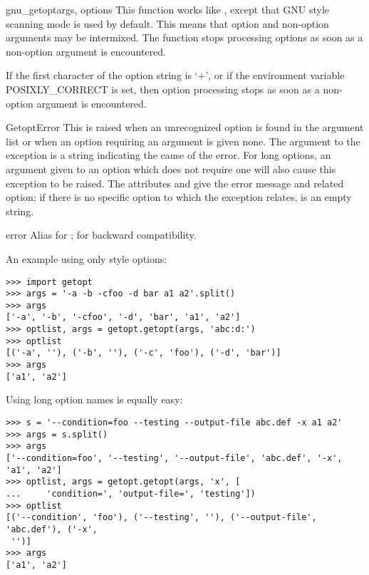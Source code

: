 \begin{funcdesc}{gnu_getopt}{args, options}
This function works like , except that GNU style
scanning mode is used by default. This means that option and
non-option arguments may be intermixed. The 
function stops processing options as soon as a non-option argument is
encountered.

If the first character of the option string is `+', or if the
environment variable POSIXLY_CORRECT is set, then option processing
stops as soon as a non-option argument is encountered.

\end{funcdesc}

\begin{excdesc}{GetoptError}
This is raised when an unrecognized option is found in the argument
list or when an option requiring an argument is given none.
The argument to the exception is a string indicating the cause of the
error.  For long options, an argument given to an option which does
not require one will also cause this exception to be raised.  The
attributes  and  give the error message and
related option; if there is no specific option to which the exception
relates,  is an empty string.

\end{excdesc}

\begin{excdesc}{error}
Alias for ; for backward compatibility.
\end{excdesc}


An example using only \UNIX{} style options:

\begin{verbatim}
>>> import getopt
>>> args = '-a -b -cfoo -d bar a1 a2'.split()
>>> args
['-a', '-b', '-cfoo', '-d', 'bar', 'a1', 'a2']
>>> optlist, args = getopt.getopt(args, 'abc:d:')
>>> optlist
[('-a', ''), ('-b', ''), ('-c', 'foo'), ('-d', 'bar')]
>>> args
['a1', 'a2']
\end{verbatim}

Using long option names is equally easy:

\begin{verbatim}
>>> s = '--condition=foo --testing --output-file abc.def -x a1 a2'
>>> args = s.split()
>>> args
['--condition=foo', '--testing', '--output-file', 'abc.def', '-x', 'a1', 'a2']
>>> optlist, args = getopt.getopt(args, 'x', [
...     'condition=', 'output-file=', 'testing'])
>>> optlist
[('--condition', 'foo'), ('--testing', ''), ('--output-file', 'abc.def'), ('-x',
 '')]
>>> args
['a1', 'a2']
\end{verbatim}

